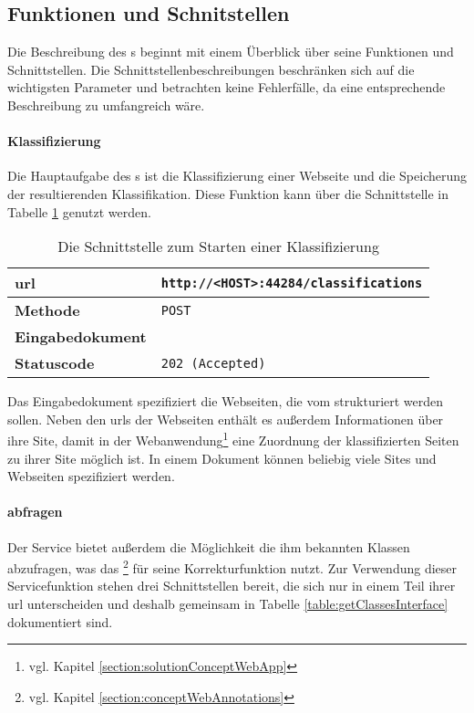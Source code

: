 \subsection{Funktionen und Schnitstellen}
    \label{section:solutionDetailsClassificationServiceFunctions}
    Die Beschreibung des {\classificationService}s beginnt mit einem
    Überblick über seine Funktionen und Schnittstellen.
    Die Schnittstellenbeschreibungen beschränken sich auf die wichtigsten
    Parameter und betrachten keine Fehlerfälle,
    da eine entsprechende Beschreibung zu umfangreich wäre.

    \paragraph{Klassifizierung}
    Die Hauptaufgabe des {\classificationService}s ist die Klassifizierung einer Webseite
    und die Speicherung der resultierenden Klassifikation.
    Diese Funktion kann über die Schnittstelle in Tabelle \ref{table:startClassificationInterface} genutzt werden.

    \begin{table}[htb]
        \centering
        \begin{tabular}{|l|l|}
        \hline
        \textbf{\gls{url}} & \texttt{http://<HOST>:44284/classifications}\\
        \hline
        \textbf{Methode} & \texttt{POST}\\
        \hline
        \textbf{Eingabedokument} & \\
        \hline
        \textbf{Statuscode} & \texttt{202 (Accepted)}\\
        \hline
        \end{tabular}
        \caption{Die Schnittstelle zum Starten einer Klassifizierung}
        \label{table:startClassificationInterface}
    \end{table}

    Das Eingabedokument spezifiziert die Webseiten,
    die vom {\classificationService} strukturiert werden sollen.
    Neben den \glspl{url} der Webseiten enthält es außerdem Informationen über ihre Site,
    damit in der Webanwendung\footnote{vgl. Kapitel \ref{section:solutionConceptWebApp}}
    eine Zuordnung der klassifizierten Seiten zu ihrer Site möglich ist.
    In einem Dokument können beliebig viele Sites und Webseiten spezifiziert werden.

    \paragraph{{\classificationModel} abfragen}
    Der Service bietet außerdem die Möglichkeit die ihm bekannten Klassen abzufragen,
    was das {\annotatorPlugin}\footnote{vgl. Kapitel \ref{section:conceptWebAnnotations}}
    für seine Korrekturfunktion nutzt.
    Zur Verwendung dieser Servicefunktion stehen drei Schnittstellen bereit,
    die sich nur in einem Teil ihrer \gls{url} unterscheiden und deshalb gemeinsam in
    Tabelle \ref{table:getClassesInterface} dokumentiert sind.

